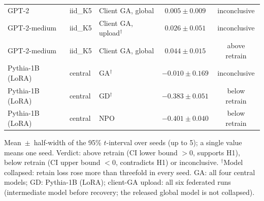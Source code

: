 \begin{table}[t]
\begin{tabular*}{\textwidth}{@{\extracolsep{\fill}}lllcc@{}}
GPT-2 & iid\_K5 & Client GA, global & $0.005 \pm 0.009$ & inconclusive \\
GPT-2-medium & iid\_K5 & Client GA, upload$^{\dagger}$ & $0.026 \pm 0.051$ & inconclusive \\
GPT-2-medium & iid\_K5 & Client GA, global & $0.044 \pm 0.015$ & above retrain \\
Pythia-1B (LoRA) & central & GA$^{\dagger}$ & $-0.010 \pm 0.169$ & inconclusive \\
Pythia-1B (LoRA) & central & GD$^{\dagger}$ & $-0.383 \pm 0.051$ & below retrain \\
Pythia-1B (LoRA) & central & NPO & $-0.401 \pm 0.040$ & below retrain \\
\bottomrule
\end{tabular*}

\smallskip
{\footnotesize Mean~$\pm$~half-width of the 95\% $t$-interval over seeds (up to 5); a single value means one seed. Verdict: above retrain (CI lower bound $>0$, supports H1), below retrain (CI upper bound $<0$, contradicts H1) or inconclusive. $^{\dagger}$Model collapsed: retain loss rose more than threefold in every seed. GA: all four central models; GD: Pythia-1B (LoRA); client-GA upload: all six federated runs (intermediate model before recovery; the released global model is not collapsed).\par}
\end{table}
